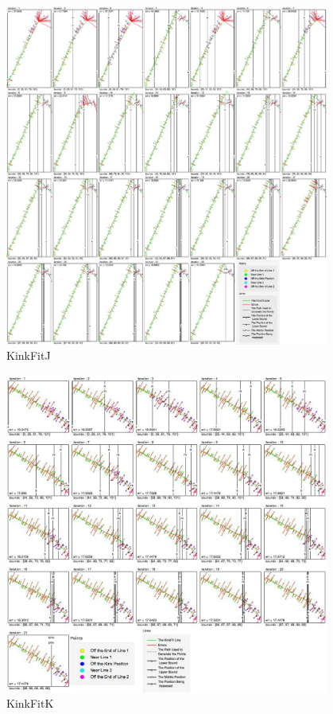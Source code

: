 \begin{figure}[h!]
  \centering
    \includegraphics[width=0.95\textwidth]{Chapter4/Figs/KinkFit_J.jpg}
    \caption{KinkFitJ}\label{fig:KinkFitJ}
\end{figure}

\begin{figure}[h!]
  \centering
    \includegraphics[width=0.95\textwidth]{Chapter4/Figs/KinkFit_K.jpg}
    \caption{KinkFitK}\label{fig:KinkFitK}
\end{figure}
